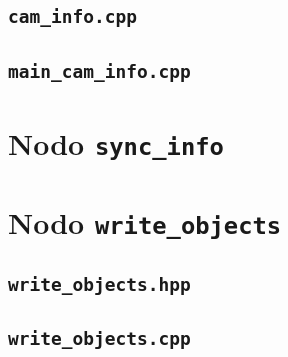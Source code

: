 \lstset{style=cppstyle}
\vspace{0.2cm}

\vspace{0.4cm}

\subsection*{\texttt{cam\_info.cpp}}

\vspace{0.2cm}

\vspace{0.4cm}

\subsection*{\texttt{main\_cam\_info.cpp}}

\vspace{0.2cm}

\vspace{0.4cm}

\section{Nodo \texttt{sync\_info}}

\lstset{style=pythonstyle}
\vspace{0.2cm}

\vspace{0.4cm}

\section{Nodo \texttt{write\_objects}}

\subsection*{\texttt{write\_objects.hpp}}

\lstset{style=cppstyle}
\vspace{0.2cm}

\vspace{0.4cm}

\subsection*{\texttt{write\_objects.cpp}}

